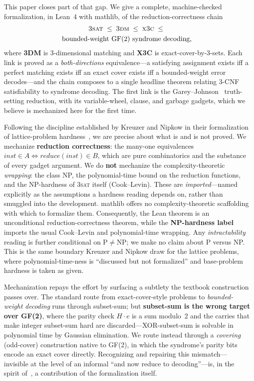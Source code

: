 \documentclass[sigplan,review,anonymous]{acmart}
\begin{document}
This paper closes part of that gap. We give a complete, machine-checked formalization, in Lean~4 with mathlib,
of the reduction-correctness chain
\[
  \begin{gathered}
    \textsc{3sat} \;\le\; \textsc{3dm} \;\le\; \textsc{x3c} \;\le\;\\
    \text{bounded-weight GF(2) syndrome decoding,}
  \end{gathered}
\]
where \textbf{3DM} is 3-dimensional matching and \textbf{X3C} is exact-cover-by-3-sets. Each link is proved as a
\emph{both-directions} equivalence---a satisfying assignment exists iff a perfect matching exists iff an exact
cover exists iff a bounded-weight error decodes---and the chain composes to a single headline theorem relating
3-CNF satisfiability to syndrome decoding. The first link is the Garey--Johnson~\cite{GJ79} truth-setting
reduction, with its variable-wheel, clause, and garbage gadgets, which we believe is mechanized here for the
first time.

Following the discipline established by Kreuzer and Nipkow in their formalization of lattice-problem
hardness~\cite{KN23}, we are precise about what is and is not proved. We mechanize \textbf{reduction
correctness}: the many-one equivalences $\mathit{inst} \in A \iff \mathit{reduce}(\mathit{inst}) \in B$, which
are pure combinatorics and the substance of every gadget argument. We do \textbf{not} mechanize the
complexity-theoretic \emph{wrapping}: the class NP, the polynomial-time bound on the reduction functions, and
the NP-hardness of \textsc{3sat} itself (Cook--Levin). These are \emph{imported}---named explicitly as the
assumptions a hardness reading depends on, rather than smuggled into the development. mathlib offers no
complexity-theoretic scaffolding with which to formalize them. Consequently, the Lean theorem is an
unconditional reduction-correctness theorem, while the \textbf{NP-hardness label} imports the usual Cook--Levin
and polynomial-time wrapping. Any \emph{intractability} reading is further conditional on
$\mathrm P \neq \mathrm{NP}$; we make no claim about P versus NP. This is the same boundary Kreuzer and Nipkow
draw for the lattice problems, where polynomial-time-ness is ``discussed but not formalized'' and base-problem
hardness is taken as given.

Mechanization repays the effort by surfacing a subtlety the textbook construction passes over. The standard
route from exact-cover-style problems to \emph{bounded-weight decoding} runs through subset-sum; but
\textbf{subset-sum is the wrong target over GF(2)}, where the parity check $H \cdot e$ is a sum modulo~2 and the
carries that make integer subset-sum hard are discarded---XOR-subset-sum is solvable in polynomial time by
Gaussian elimination. We route instead through a \emph{covering} (odd-cover) construction native to GF(2), in
which the syndrome's parity bits encode an exact cover directly. Recognizing and repairing this mismatch---
invisible at the level of an informal ``and now reduce to decoding''---is, in the spirit of~\cite{KN23}, a
contribution of the formalization itself.
\end{document}
